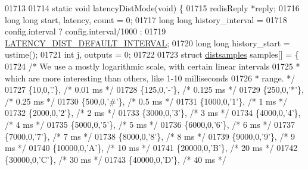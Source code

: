 \begin{DoxyCode}
{{{{{{{{{{{{{{{{{{{{{{{{{{{{{{{{{{{{{{{{{{{{{{{01713 
01714 \textcolor{keyword}{static} \textcolor{keywordtype}{void} latencyDistMode(\textcolor{keywordtype}{void}) \{
01715     redisReply *reply;
01716     \textcolor{keywordtype}{long} \textcolor{keywordtype}{long} start, latency, count = 0;
01717     \textcolor{keywordtype}{long} \textcolor{keywordtype}{long} history\_interval =
01718         config.interval ? config.interval/1000 :
01719                           \hyperlink{redis-cli_8c_a6441de268c4b35721ec39471428d836f}{LATENCY\_DIST\_DEFAULT\_INTERVAL};
01720     \textcolor{keywordtype}{long} \textcolor{keywordtype}{long} history\_start = ustime();
01721     \textcolor{keywordtype}{int} j, outputs = 0;
01722 
01723     \textcolor{keyword}{struct} \hyperlink{structdistsamples}{distsamples} samples[] = \{
01724         \textcolor{comment}{/* We use a mostly logarithmic scale, with certain linear intervals}
01725 \textcolor{comment}{         * which are more interesting than others, like 1-10 milliseconds}
01726 \textcolor{comment}{         * range. */}
01727         \{10,0,\textcolor{stringliteral}{'.'}\},         \textcolor{comment}{/* 0.01 ms */}
01728         \{125,0,\textcolor{stringliteral}{'-'}\},        \textcolor{comment}{/* 0.125 ms */}
01729         \{250,0,\textcolor{stringliteral}{'*'}\},        \textcolor{comment}{/* 0.25 ms */}
01730         \{500,0,\textcolor{stringliteral}{'#'}\},        \textcolor{comment}{/* 0.5 ms */}
01731         \{1000,0,\textcolor{stringliteral}{'1'}\},       \textcolor{comment}{/* 1 ms */}
01732         \{2000,0,\textcolor{stringliteral}{'2'}\},       \textcolor{comment}{/* 2 ms */}
01733         \{3000,0,\textcolor{stringliteral}{'3'}\},       \textcolor{comment}{/* 3 ms */}
01734         \{4000,0,\textcolor{stringliteral}{'4'}\},       \textcolor{comment}{/* 4 ms */}
01735         \{5000,0,\textcolor{stringliteral}{'5'}\},       \textcolor{comment}{/* 5 ms */}
01736         \{6000,0,\textcolor{stringliteral}{'6'}\},       \textcolor{comment}{/* 6 ms */}
01737         \{7000,0,\textcolor{stringliteral}{'7'}\},       \textcolor{comment}{/* 7 ms */}
01738         \{8000,0,\textcolor{stringliteral}{'8'}\},       \textcolor{comment}{/* 8 ms */}
01739         \{9000,0,\textcolor{stringliteral}{'9'}\},       \textcolor{comment}{/* 9 ms */}
01740         \{10000,0,\textcolor{stringliteral}{'A'}\},      \textcolor{comment}{/* 10 ms */}
01741         \{20000,0,\textcolor{stringliteral}{'B'}\},      \textcolor{comment}{/* 20 ms */}
01742         \{30000,0,\textcolor{stringliteral}{'C'}\},      \textcolor{comment}{/* 30 ms */}
01743         \{40000,0,\textcolor{stringliteral}{'D'}\},      \textcolor{comment}{/* 40 ms */}
}}}}}}}}}}}}}}}}}}}}}}}}}}}}}}}}}}}}}}}}}}}}}}}
\end{DoxyCode}
